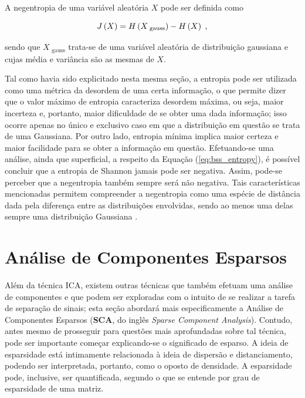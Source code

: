\begin{definition}[Negentropia]

    A negentropia de uma variável aleatória $X$ pode ser definida como

    \begin{equation}
        J\left(X\right) = H\left(X_{\text{\ gauss}}\right) - H\left(X\right)
        \hspace{0.1cm},
        \vspace{0.2cm}
        \label{eq:bss_negentropy}
    \end{equation}

    \noindent sendo que $X_{\text{\ gauss}}$ trata-se de uma variável aleatória de distribuição gaussiana e cujas média e variância são as mesmas de $X$.

\end{definition}

Tal como havia sido explicitado nesta mesma seção, a entropia pode ser utilizada como uma métrica da desordem de uma certa informação, o que permite dizer que o valor máximo de entropia caracteriza desordem máxima, ou seja, maior incerteza e, portanto, maior dificuldade de se obter uma dada informação; isso ocorre apenas no único e exclusivo caso em que a distribuição em questão se trata de uma Gaussiana. Por outro lado, entropia mínima implica maior certeza e maior facilidade para se obter a informação em questão. Efetuando-se uma análise, ainda que superficial, a respeito da Equação (\ref{eq:bss_entropy}), é possível concluir que a entropia de Shannon jamais pode ser negativa. Assim, pode-se perceber que a negentropia também sempre será não negativa. Tais características mencionadas permitem compreender a negentropia como uma espécie de distância dada pela diferença entre as distribuições envolvidas, sendo ao menos uma delas sempre uma distribuição Gaussiana \citep{suyama2007proposta}.




\section{Análise de Componentes Esparsos}
\label{sec:bss_sca}

Além da técnica ICA, existem outras técnicas que também efetuam uma análise de componentes e que podem ser exploradas com o intuito de se realizar a tarefa de separação de sinais; esta seção abordará mais especificamente a Análise de Componentes Esparsos (\textbf{SCA}, do inglês \textit{Sparse Component Analysis}). Contudo, antes mesmo de prosseguir para questões mais aprofundadas sobre tal técnica, pode ser importante começar explicando-se o significado de esparso. A ideia de esparsidade está intimamente relacionada à ideia de dispersão e distanciamento, podendo ser interpretada, portanto, como o oposto de densidade. A esparsidade pode, inclusive, ser quantificada, segundo o que se entende por grau de esparsidade de uma matriz.\\

